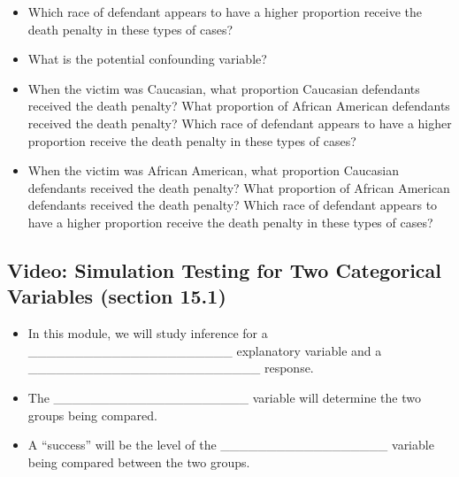 \documentclass[
]{report}
\providecommand{\tightlist}{%
  \setlength{\itemsep}{0pt}\setlength{\parskip}{0pt}}
\begin{document}
\begin{itemize}
\tightlist
\item
  Which race of defendant appears to have a higher proportion receive the death penalty in these types of cases?
\end{itemize}

\vspace{0.2in}

\begin{itemize}
\tightlist
\item
  What is the potential confounding variable?
\end{itemize}

\vspace{0.3in}

\begin{itemize}
\tightlist
\item
  When the victim was Caucasian, what proportion Caucasian defendants received the death penalty? What proportion of African American defendants received the death penalty? Which race of defendant appears to have a higher proportion receive the death penalty in these types of cases?
\end{itemize}

\vspace{0.4in}

\begin{itemize}
\tightlist
\item
  When the victim was African American, what proportion Caucasian defendants received the death penalty? What proportion of African American defendants received the death penalty? Which race of defendant appears to have a higher proportion receive the death penalty in these types of cases?
\end{itemize}

\vspace{0.4in}

\subsection*{Video: Simulation Testing for Two Categorical Variables (section 15.1)}\label{video-simulation-testing-for-two-categorical-variables-section-15.1}


\begin{itemize}
\item
  In this module, we will study inference for a \_\_\_\_\_\_\_\_\_\_\_\_\_\_\_\_\_\_\_\_\_\_ explanatory variable and a \_\_\_\_\_\_\_\_\_\_\_\_\_\_\_\_\_\_\_\_\_\_\_\_\_ response.
\item
  The \_\_\_\_\_\_\_\_\_\_\_\_\_\_\_\_\_\_\_\_\_ variable will determine the two groups being compared.
\item
  A ``success'' will be the level of the \_\_\_\_\_\_\_\_\_\_\_\_\_\_\_\_\_\_ variable being compared between the two groups.
\end{itemize}
\end{document}
